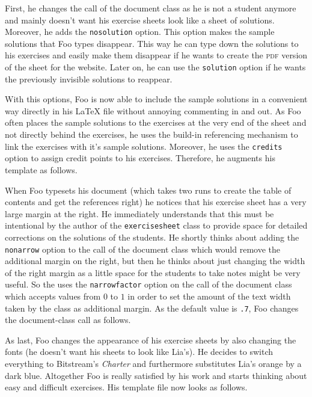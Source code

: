 \documentclass{report}
\def\exercisesheet{\texttt{exercisesheet}}
\begin{document}
First, he changes the call of the document class as he is not a
student anymore and mainly doesn't want his exercise sheets look like
a sheet of solutions. Moreover, he adds the \lstinline{nosolution}
option. This option makes the sample solutions that Foo types
disappear. This way he can type down the solutions to his exercises
and easily make them disappear if he wants to create the \textsc{pdf}
version of the sheet for the website. Later on, he can use the
\lstinline{solution} option if he wants the previously invisible
solutions to reappear.



With this options, Foo is now able to include the sample solutions in
a convenient way directly in his \LaTeX{} file without annoying
commenting in and out. As Foo often places the sample solutions to the
exercises at the very end of the sheet and not directly behind the
exercises, he uses the build-in referencing mechanism to link the
exercises with it's sample solutions. Moreover, he uses the
\lstinline{credits} option to assign credit points to his exercises.
Therefore, he augments his template as follows.



When Foo typesets his document (which takes two runs to create the
table of contents and get the references right) he notices that his
exercise sheet has a very large margin at the right. He immediately
understands that this must be intentional by the author of the
\exercisesheet{} class to provide space for detailed corrections on
the solutions of the students. He shortly thinks about adding the
\lstinline{nonarrow} option to the call of the document class which
would remove the additional margin on the right, but then he thinks
about just changing the width of the right margin as a little space
for the students to take notes might be very useful. So the uses the
\lstinline{narrowfactor} option on the call of the document class
which accepts values from $0$ to $1$ in order to set the amount of the
text width taken by the class as additional margin. As the default
value is \lstinline{.7}, Foo changes the document-class call as
follows.



As last, Foo changes the appearance of his exercise sheets by also
changing the fonts (he doesn't want his sheets to look like Lia's). He
decides to switch everything to Bitstream's \emph{Charter} and
furthermore substitutes Lia's orange by a dark blue. Altogether Foo is
really satisfied by his work and starts thinking about easy and
difficult exercises. His template file now looks as follows.
\end{document}
